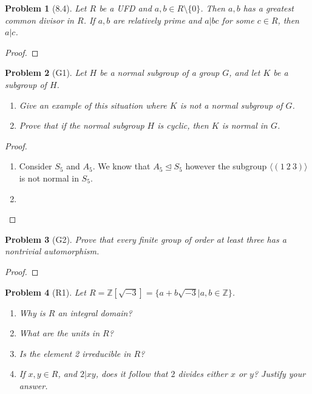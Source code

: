 \documentclass[10pt]{article}
\newcommand{\sk}{\vskip 10mm}
\newcommand{\bb}[1]{\mathbb{#1}}
\theoremstyle{plain}
\newtheorem{problem}{Problem}
\theoremstyle{remark}
\begin{document}
\sk

\begin{problem}[8.4]
  Let $R$ be a UFD and $a,b\in R\setminus\{0\}$. Then $a,b$ has a greatest
  common divisor in $R$. If $a,b$ are relatively prime and $a|bc$ for some
  $c\in R$, then $a|c$.
\end{problem}

\begin{proof}
  
\end{proof}

\sk

\begin{problem}[G1]
  Let $H$ be a normal subgroup of a group $G$, and let $K$ be a subgroup of $H$.
  \begin{enumerate}
  \item Give an example of this situation where $K$ is not a normal
    subgroup of $G$.
  \item Prove that if the normal subgroup $H$ is cyclic, then $K$ is normal
    in $G$.
  \end{enumerate}
\end{problem}

\begin{proof}
  \begin{enumerate}
  \item Consider $S_5$ and $A_5$. We know that $A_5\trianglelefteq S_5$ however
    the subgroup $\langle(1\ 2\ 3)\rangle$ is not normal in $S_5$.
  \item 
  \end{enumerate}
\end{proof}

\sk

\begin{problem}[G2]
  Prove that every finite group of order at least three has a nontrivial
  automorphism.
\end{problem}

\begin{proof}
  
\end{proof}

\sk

\begin{problem}[R1]
  Let $R=\bb{Z}[\sqrt{-3}]=\{a+b\sqrt{-3}|a,b\in\bb{Z}\}$.
  \begin{enumerate}
  \item Why is $R$ an integral domain?
  \item What are the units in $R$?
  \item Is the element 2 irreducible in $R$?
  \item If $x,y\in R$, and $2|xy$, does it follow that $2$ divides
    either $x$ or $y$? Justify your answer.
  \end{enumerate}
\end{problem}
\end{document}
